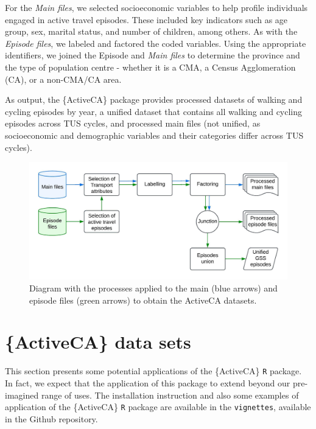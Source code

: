\documentclass[Royal,times,sageh]{sagej}
\begin{document}
For the \emph{Main files}, we selected socioeconomic variables to help
profile individuals engaged in active travel episodes. These included
key indicators such as age group, sex, marital status, and number of
children, among others. As with the \emph{Episode files}, we labeled and
factored the coded variables. Using the appropriate identifiers, we
joined the Episode and \emph{Main files} to determine the province and
the type of population centre - whether it is a CMA, a Census
Agglomeration (CA), or a non-CMA/CA area.

As output, the \{ActiveCA\} package provides processed datasets of
walking and cycling episodes by year, a unified dataset that contains
all walking and cycling episodes across TUS cycles, and processed main
files (not unified, as socioeconomic and demographic variables and their
categories differ across TUS cycles).

\begin{figure}

{\centering \includegraphics[width=1\linewidth]{Manuscript-figures/RPackages - ActiveCA} 

}

\caption{Diagram with the processes applied to the main (blue arrows) and episode files (green arrows) to obtain the ActiveCA datasets.}\label{fig:process-figure}
\end{figure}

\section{\{ActiveCA\} data sets}\label{activeca-data-sets}

This section presents some potential applications of the \{ActiveCA\}
\texttt{R} package. In fact, we expect that the application of this
package to extend beyond our pre-imagined range of uses. The
installation instruction and also some examples of application of the
\{ActiveCA\} \texttt{R} package are available in the \texttt{vignettes},
available in the Github repository.
\end{document}
